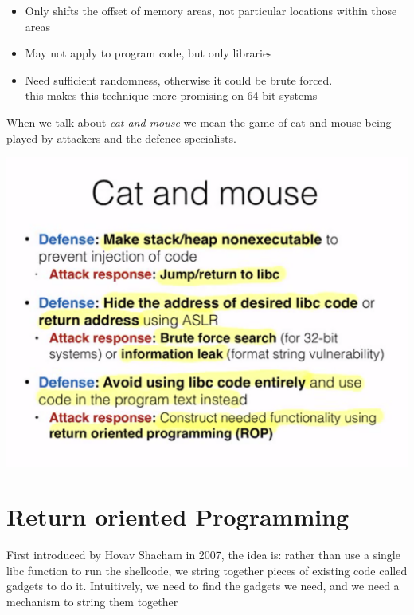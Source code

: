 \documentclass[11pt, oneside]{article}   	%
\begin{document}
\begin{itemize}
\item Only shifts the offset of memory areas, not particular locations within those areas
\item May not apply to program code, but only libraries
\item Need sufficient randomness, otherwise it could be brute forced.\\
this makes this technique more promising on 64-bit systems
\end{itemize}
When we talk about \emph{cat and mouse} we mean the game of cat and mouse being played by attackers and the defence specialists.
\begin{center}
\includegraphics[scale = 0.5]{catmouse}
\end{center}

\section*{Return oriented Programming}
First introduced by Hovav Shacham in 2007, the idea is: rather than use a single libc function to run the shellcode, we string together pieces of existing code called gadgets to do it. Intuitively, we need to find the gadgets we need, and we need a mechanism to string them together
\end{document}
